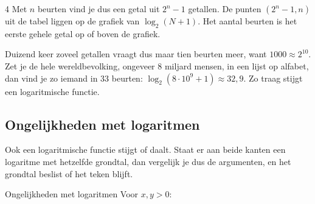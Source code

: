 \begin{alleenvoor}{4}
{Met $n$ beurten vind je dus een getal uit $2^n - 1$ getallen.
De punten $(2^n - 1, n)$ uit de tabel liggen op de grafiek van $\log_2(N + 1)$. Het aantal beurten is het eerste gehele getal op of boven de grafiek.}

Duizend keer zoveel getallen vraagt dus maar tien beurten meer, want $1000 \approx 2^{10}$. Zet je de hele wereldbevolking, ongeveer 8 miljard mensen, in een lijst op alfabet, dan vind je zo iemand in 33 beurten: $\log_2(8 \cdot 10^9 + 1) \approx 32{,}9$. Zo traag stijgt een logaritmische functie.

\subsection{Ongelijkheden met logaritmen}

Ook een logaritmische functie stijgt of daalt. Staat er aan beide kanten een logaritme met hetzelfde grondtal, dan vergelijk je dus de argumenten, en het grondtal beslist of het teken blijft.

\begin{theorie}
\begin{stelling}{Ongelijkheden met logaritmen}
Voor $x, y > 0$:


\end{stelling}
\end{theorie}
\end{alleenvoor}
